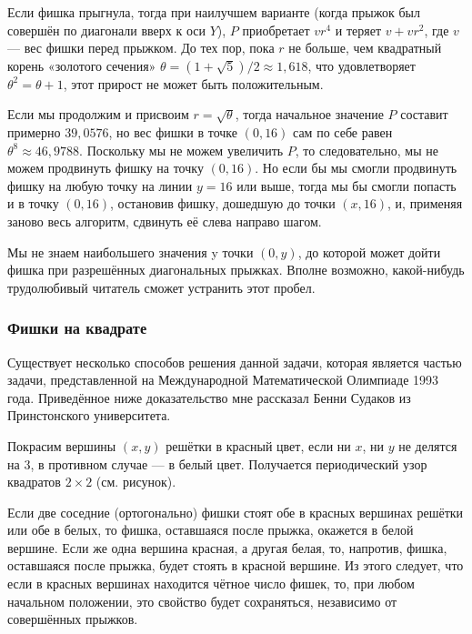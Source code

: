 Если фишка прыгнула, тогда при наилучшем варианте (когда прыжок был совершён по диагонали вверх к оси $Y$), $P$ приобретает $vr^4$ и теряет $v+vr^2$, где $v$ --- вес фишки перед прыжком.
До тех пор, пока $r$ не больше, чем квадратный корень «золотого сечения» $\theta=(1+\sqrt5)/2\approx 1{,}618$, что удовлетворяет $\theta^2=\theta+1$, этот прирост не может быть положительным.

Если мы продолжим и присвоим $r = \sqrt{\theta}$, тогда начальное значение $P$ составит примерно $39{,}0576$, но вес фишки в точке $(0, 16)$ сам по себе равен $\theta^8\approx 46{,}9788$.
Поскольку мы не можем увеличить $P$, то следовательно, мы не можем продвинуть фишку на точку $(0, 16)$.
Но если бы мы смогли продвинуть фишку на любую точку на линии $y = 16$ или выше, тогда мы бы смогли попасть и в точку $(0, 16)$, остановив фишку, дошедшую до точки $(x, 16)$, и, применяя заново весь алгоритм, сдвинуть её слева направо шагом.
\heart

Мы не знаем наибольшего значения y точки $(0, y)$, до которой может дойти фишка при разрешённых диагональных прыжках.
Вполне возможно, какой-нибудь трудолюбивый читатель сможет устранить этот пробел.

\subsubsection*{Фишки на квадрате}%

Существует несколько способов решения данной задачи, которая является частью задачи, представленной на Международной Математической Олимпиаде 1993 года.
Приведённое ниже доказательство мне рассказал Бенни Судаков из Принстонского университета.

\medskip

Покрасим вершины $(x, y)$ решётки в красный цвет, если ни $x$, ни $y$ не делятся на $3$, в противном случае --- в белый цвет.
Получается периодический узор квадратов $2\times 2$ (см. рисунок).

Если две соседние (ортогонально) фишки стоят обе в красных вершинах решётки или обе в белых, то фишка, оставшаяся после прыжка, окажется в белой вершине.
Если же одна вершина красная, а другая белая, то, напротив, фишка, оставшаяся после прыжка, будет стоять в красной вершине.
Из этого следует, что если в красных вершинах находится чётное число фишек, то, при любом начальном положении, это свойство будет сохраняться, независимо от совершённых прыжков.


